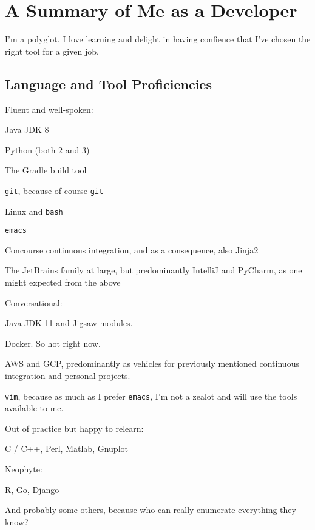 \documentclass[10pt,letterpaper]{article}
\newcommand\ttt\texttt
\renewenvironment{itemize}{
  \begin{list}{}{
    \setlength{\leftmargin}{1.5em}
    \setlength{\itemsep}{0.25em}
    \setlength{\parskip}{0pt}
    \setlength{\parsep}{0.25em}
  }
}{
  \end{list}
}
\begin{document}

\newpage

\section*{A Summary of Me as a Developer}

I'm a polyglot.  I love learning and delight in having confience that I've chosen the right tool for a given job.

\subsection*{Language and Tool Proficiencies}
\begin{itemize}
  \item Fluent and well-spoken:
  \begin{itemize}
    \item Java JDK 8
    \item Python (both 2 and 3)
    \item The Gradle build tool
    \item \ttt{git}, because of course \ttt{git}
    \item Linux and \ttt{bash}
    \item \ttt{emacs}
    \item Concourse continuous integration, and as a consequence, also Jinja2
    \item The JetBrains family at large, but predominantly IntelliJ and PyCharm, as one might expected from the above
  \end{itemize}
  \item Conversational:
  \begin{itemize}
    \item Java JDK 11 and Jigsaw modules.
    \item Docker.  So hot right now.
    \item AWS and GCP, predominantly as vehicles for previously mentioned continuous integration and personal projects.
    \item \ttt{vim}, because as much as I prefer \ttt{emacs}, I'm not a zealot and will use the tools available to me.
  \end{itemize}
  \item Out of practice but happy to relearn:
  \begin{itemize}
    \item C / C++, Perl, Matlab, Gnuplot
  \end{itemize}
  \item Neophyte:
  \begin{itemize}
    \item R, Go, Django
  \end{itemize}
  \item And probably some others, because who can really enumerate everything they know?
\end{itemize}
\end{document}
